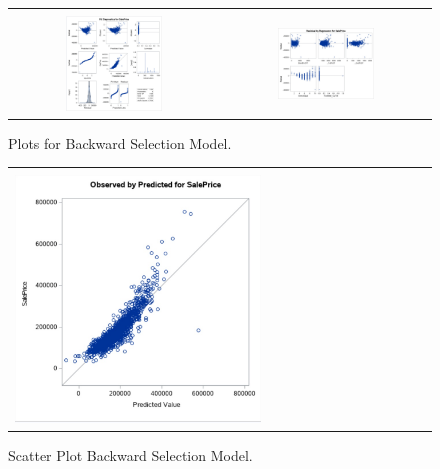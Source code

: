 \documentclass[11pt]{scrartcl} %
\begin{document}
\begin{figure}[H] %
	\centering
	\begin{tabular}{p{} p{}}
	\hline
	\multicolumn{1}{|c}{} &  \multicolumn{1}{c|}{} \\
		\multicolumn{1}{|c}{\includegraphics[width=0.48\textwidth]{../graphics/A2BWAss1}} &
		\multicolumn{1}{c|}{\includegraphics[width=0.48\textwidth]{../graphics/A2BWAss2}}\\
		\hline
	\end{tabular}		
	\caption{Plots for Backward Selection Model.} %
	\label{fig:A2BWAss}
\end{figure}
\begin{figure}[H] %
	\centering
	\begin{tabular}{| p{}|}
	\hline
	\\
	\includegraphics[width=0.60\textwidth]{../graphics/A2BWscatt}\\
	\hline
	\end{tabular}	
	\caption{Scatter Plot Backward Selection Model.} %
	\label{fig:A2BWscatt}
\end{figure}
\end{document}
